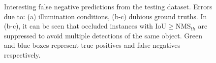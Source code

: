 \begin{figure}[!ht]
  \caption{Interesting false negative predictions from the testing dataset. Errors due to: (a) illumination conditions, (b-c) dubious ground truths. In (b-c), it can be seen that occluded instances with $\text{IoU} \geq \text{NMS}_{th}$ are suppressed to avoid multiple detections of the same object. Green and blue boxes represent true positives and false negatives respectively.}
  \label{ch6:fig4}
\end{figure}

